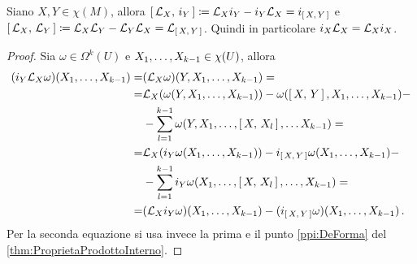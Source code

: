 \begin{corollary}
	Siano $X,Y\in\chi(M)$, allora $\comm{\Lie_X}{i_Y} \coloneqq \Lie_X i_Y - i_Y \Lie_X = i_{\comm XY}$ e $\comm{\Lie_X}{\Lie_Y}\coloneqq \Lie_X\Lie_Y - \Lie_Y\Lie_X = \Lie_{\comm XY}$.
	Quindi in particolare $i_X\Lie_X = \Lie_X i_X$.
\end{corollary}
\begin{proof}
	Sia $\omega \in \Omega^k(U)$ e $\seqb X{k-1}, \in \chi(U)$, allora
	\begin{align*}
		(i_Y\Lie_X\omega)(\seqb X{k-1},) =& (\Lie_X\omega)(Y,\seqb X{k-1},) =\\
		=&\Lie_X(\omega(Y,\seqb X{k-1},)) -\omega (\comm XY, \seqb X{k-1},) - \\
		&-\sum_{l=1}^{k-1}\omega(Y,X_1,\ldots,\comm{X}{X_l},\ldots X_{k-1}) =\\
		=& \Lie_X(i_Y\omega(\seqb X{k-1},)) -i_{\comm XY} \omega (\seqb X{k-1},) - \\
		&-\sum_{l=1}^{k-1} i_Y\omega(X_1,\ldots, \comm X{X_l}, \ldots, X_{k-1}) =\\
		=& (\Lie_X i_Y\omega)(\seqb X{k-1},) - (i_{\comm XY}\omega)(\seqb X{k-1},) \punto
	\end{align*}
	Per la seconda equazione si usa invece la prima e il punto \ref{ppi:DeForma} del \cref{thm:ProprietaProdottoInterno}.
\end{proof}

